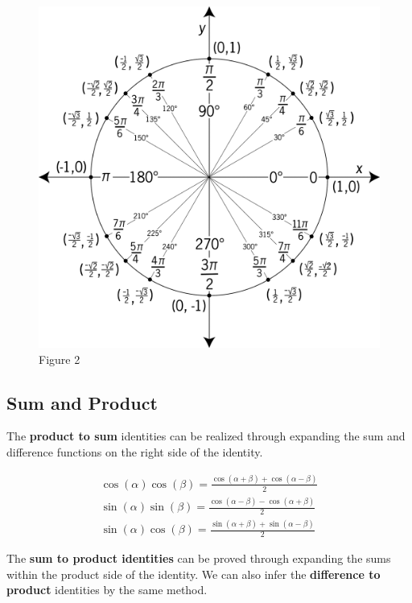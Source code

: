         \begin{figure}[h]
            \centering
            \includegraphics[scale = 0.2] {Resources/Unit2Trig/unit_circle.png}
            \caption*{Figure 2}
        \end{figure}



    \subsection{Sum and Product}
        \noindent The \color{purple} \textbf{product to sum} \color{black} identities can be
        realized through expanding the sum and difference functions on\textbf{} the right side
        of the identity.

        \begin{align*}
            \cos(\alpha)\cos(\beta)=\frac{\cos(\alpha+\beta)+\cos(\alpha-\beta)}{2} \\
            \sin(\alpha)\sin(\beta)=\frac{\cos(\alpha-\beta)-\cos(\alpha+\beta)}{2} \\
            \sin(\alpha)\cos(\beta)=\frac{\sin(\alpha+\beta)+\sin(\alpha-\beta)}{2}
        \end{align*}

        \noindent The \color{purple} \textbf{sum to product identities} \color{black} can be
        proved through expanding the sums within the product side of the identity. We can also
        infer the \color{purple} \textbf{difference to product} \color{black} identities by the
        same method.

